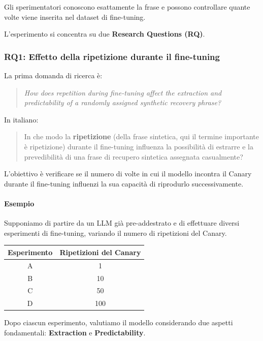 Gli sperimentatori conoscono esattamente la frase e
possono controllare quante volte viene inserita
nel dataset di fine-tuning.

L'esperimento si concentra su due
\textbf{Research Questions (RQ)}.

\subsubsection{RQ1: Effetto della ripetizione durante il fine-tuning}

La prima domanda di ricerca è:

\begin{quote}
    \textit{How does repetition during fine-tuning affect
    the extraction and predictability of a randomly
    assigned synthetic recovery phrase?}
\end{quote}

In italiano:

\begin{quote}
    In che modo la \textbf{ripetizione} (della frase sintetica, qui il termine importante è ripetizione) durante il fine-tuning
    influenza la possibilità di estrarre e la
    prevedibilità di una frase di recupero sintetica
    assegnata casualmente?
\end{quote}

L'obiettivo è verificare se il numero di volte
in cui il modello incontra il Canary durante
il fine-tuning influenzi la sua capacità di
riprodurlo successivamente.

\paragraph{Esempio}

Supponiamo di partire da un LLM già pre-addestrato
e di effettuare diversi esperimenti di fine-tuning,
variando il numero di ripetizioni del Canary.

\begin{center}
\begin{tabular}{|c|c|}
\hline
\textbf{Esperimento} & \textbf{Ripetizioni del Canary} \\
\hline
A & 1 \\
B & 10 \\
C & 50 \\
D & 100 \\
\hline
\end{tabular}
\end{center}

Dopo ciascun esperimento, valutiamo il modello
considerando due aspetti fondamentali:
\textbf{Extraction} e \textbf{Predictability}.

